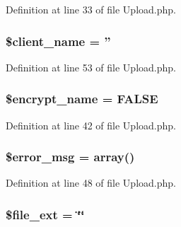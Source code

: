 Definition at line 33 of file Upload.\-php.

\hypertarget{class_c_i___upload_a3b81ba4d3535269e20e0b4a2ddab2edc}{
\subsubsection[{\$client\-\_\-name}]{\setlength{\rightskip}{0pt plus 5cm}\$client\-\_\-name = ''}}\label{class_c_i___upload_a3b81ba4d3535269e20e0b4a2ddab2edc}


Definition at line 53 of file Upload.\-php.

\hypertarget{class_c_i___upload_a54a751add0762edd4da11373e3b56687}{
\subsubsection[{\$encrypt\-\_\-name}]{\setlength{\rightskip}{0pt plus 5cm}\$encrypt\-\_\-name = F\-A\-L\-S\-E}}\label{class_c_i___upload_a54a751add0762edd4da11373e3b56687}


Definition at line 42 of file Upload.\-php.

\hypertarget{class_c_i___upload_acf910733622c1fa671b9f755c69c2ec7}{
\subsubsection[{\$error\-\_\-msg}]{\setlength{\rightskip}{0pt plus 5cm}\$error\-\_\-msg = array()}}\label{class_c_i___upload_acf910733622c1fa671b9f755c69c2ec7}


Definition at line 48 of file Upload.\-php.

\hypertarget{class_c_i___upload_a65b080519869bc14d792c1800e3362f5}{
\subsubsection[{\$file\-\_\-ext}]{\setlength{\rightskip}{0pt plus 5cm}\$file\-\_\-ext = \char`\"{}\char`\"{}}}\label{class_c_i___upload_a65b080519869bc14d792c1800e3362f5}


